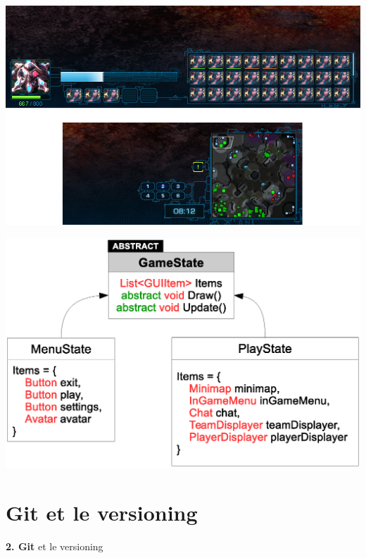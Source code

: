 \documentclass[12pt]{beamer}
\begin{document}
\begin{frame}
    \begin{center}
        \includegraphics[scale=0.4]{img/exodus-ig-ui.png}
    \end{center}
\end{frame}

\begin{frame}
    \begin{center}
        \vspace{1cm}
        \includegraphics[scale=0.5]{img/gamestate.eps}
    \end{center}
\end{frame}

\section{Git et le versioning}

\begingroup
{}
\begin{frame}
    \begin{center}
        \vspace{1cm}
        {\Large\color{background} \textbf{2. Git} et le versioning}
    \end{center}
\end{frame}
\endgroup
\end{document}
